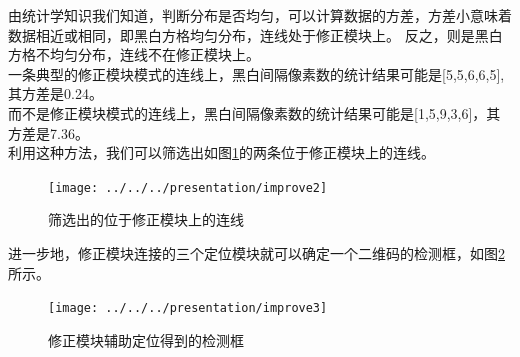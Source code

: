 由统计学知识我们知道，判断分布是否均匀，可以计算数据的方差，方差小意味着数据相近或相同，即黑白方格均匀分布，连线处于修正模块上。
反之，则是黑白方格不均匀分布，连线不在修正模块上。\\
一条典型的修正模块模式的连线上，黑白间隔像素数的统计结果可能是[5,5,6,6,5], 其方差是0.24。\\
而不是修正模块模式的连线上，黑白间隔像素数的统计结果可能是[1,5,9,3,6]，其方差是7.36。\\
利用这种方法，我们可以筛选出如图\ref{fig:improve2}的两条位于修正模块上的连线。
\begin{figure}[h]
\centering
\texttt{[image: ../../../presentation/improve2]}
\caption[improve2]{筛选出的位于修正模块上的连线}
\label{fig:improve2}
\end{figure}
进一步地，修正模块连接的三个定位模块就可以确定一个二维码的检测框，如图\ref{fig:improve3}所示。
\begin{figure}[h]
\centering
\texttt{[image: ../../../presentation/improve3]}
\caption[improve3]{修正模块辅助定位得到的检测框}
\label{fig:improve3}
\end{figure}
